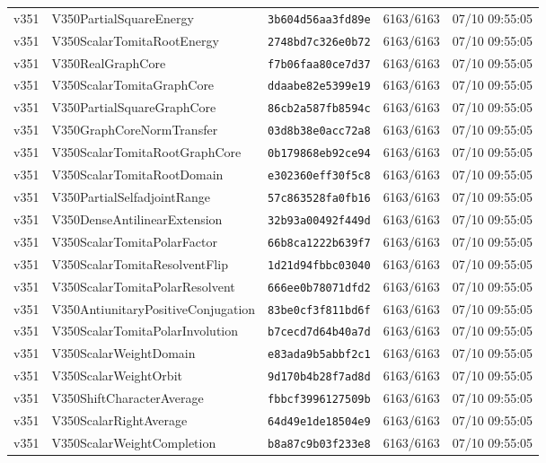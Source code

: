 \documentclass[11pt]{article}
\theoremstyle{definition}\newtheorem{deriv}{Derivação}
\begin{document}
{\begin{longtable}{@{}lllll@{}}
v351 & V350PartialSquareEnergy & \texttt{3b604d56aa3fd89e} & 6163/6163 & 07/10 09:55:05 \\
v351 & V350ScalarTomitaRootEnergy & \texttt{2748bd7c326e0b72} & 6163/6163 & 07/10 09:55:05 \\
v351 & V350RealGraphCore & \texttt{f7b06faa80ce7d37} & 6163/6163 & 07/10 09:55:05 \\
v351 & V350ScalarTomitaGraphCore & \texttt{ddaabe82e5399e19} & 6163/6163 & 07/10 09:55:05 \\
v351 & V350PartialSquareGraphCore & \texttt{86cb2a587fb8594c} & 6163/6163 & 07/10 09:55:05 \\
v351 & V350GraphCoreNormTransfer & \texttt{03d8b38e0acc72a8} & 6163/6163 & 07/10 09:55:05 \\
v351 & V350ScalarTomitaRootGraphCore & \texttt{0b179868eb92ce94} & 6163/6163 & 07/10 09:55:05 \\
v351 & V350ScalarTomitaRootDomain & \texttt{e302360eff30f5c8} & 6163/6163 & 07/10 09:55:05 \\
v351 & V350PartialSelfadjointRange & \texttt{57c863528fa0fb16} & 6163/6163 & 07/10 09:55:05 \\
v351 & V350DenseAntilinearExtension & \texttt{32b93a00492f449d} & 6163/6163 & 07/10 09:55:05 \\
v351 & V350ScalarTomitaPolarFactor & \texttt{66b8ca1222b639f7} & 6163/6163 & 07/10 09:55:05 \\
v351 & V350ScalarTomitaResolventFlip & \texttt{1d21d94fbbc03040} & 6163/6163 & 07/10 09:55:05 \\
v351 & V350ScalarTomitaPolarResolvent & \texttt{666ee0b78071dfd2} & 6163/6163 & 07/10 09:55:05 \\
v351 & V350AntiunitaryPositiveConjugation & \texttt{83be0cf3f811bd6f} & 6163/6163 & 07/10 09:55:05 \\
v351 & V350ScalarTomitaPolarInvolution & \texttt{b7cecd7d64b40a7d} & 6163/6163 & 07/10 09:55:05 \\
v351 & V350ScalarWeightDomain & \texttt{e83ada9b5abbf2c1} & 6163/6163 & 07/10 09:55:05 \\
v351 & V350ScalarWeightOrbit & \texttt{9d170b4b28f7ad8d} & 6163/6163 & 07/10 09:55:05 \\
v351 & V350ShiftCharacterAverage & \texttt{fbbcf3996127509b} & 6163/6163 & 07/10 09:55:05 \\
v351 & V350ScalarRightAverage & \texttt{64d49e1de18504e9} & 6163/6163 & 07/10 09:55:05 \\
v351 & V350ScalarWeightCompletion & \texttt{b8a87c9b03f233e8} & 6163/6163 & 07/10 09:55:05 \\

\end{longtable}}
\end{document}
